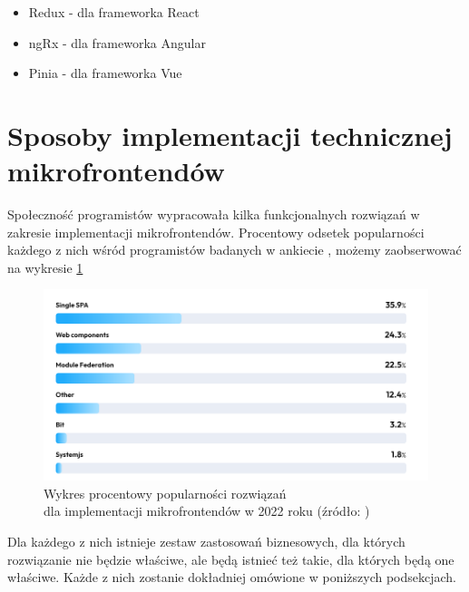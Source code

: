 \documentclass{SGGW-thesis}
\begin{document}
{\begin{itemize}
  \item Redux - dla frameworka React
  \item ngRx - dla frameworka Angular
  \item Pinia - dla frameworka Vue
\end{itemize}

\section{Sposoby implementacji technicznej mikrofrontendów}
Społeczność programistów wypracowała kilka funkcjonalnych rozwiązań w zakresie implementacji mikrofrontendów. Procentowy odsetek popularności każdego z nich wśród programistów badanych w ankiecie \cite{tsh_2022}, możemy zaobserwować na wykresie \cref{fig:tsh_frontend_implementations}

\begin{figure}[h]
	\centering
	\captionsetup{justification=centering}
	\includegraphics[width=\textwidth]{frontend_implementations_by_percent.png}
	\caption[Wykres procentowy popularności rozwiązań dla implementacji mikrofrontendów w 2022 roku]{Wykres procentowy popularności rozwiązań \\ dla implementacji mikrofrontendów w 2022 roku (źródło: \cite{tsh_2022})}
	\label{fig:tsh_frontend_implementations}
\end{figure}

Dla każdego z nich istnieje zestaw zastosowań biznesowych, dla których rozwiązanie nie będzie właściwe, ale będą istnieć też takie, dla których będą one właściwe. Każde z nich zostanie dokładniej omówione w poniższych podsekcjach.

}
\end{document}
